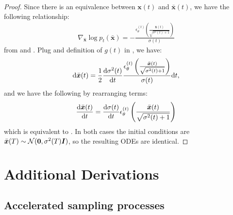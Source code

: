 \begin{proof}
Since there is an equivalence between $\bm{x}(t)$ and $\bar{\bm{x}}(t)$, we have the following relationship:
\begin{gather}
    \nabla_{\bar{\bm{x}}} \log p_t(\bar{\bm{x}}) = - \frac{\epsilon_\theta^{(t)}\left(\frac{\bar{\bm{x}}(t)}{\sqrt{\sigma^2(t) + 1}}\right)}{\sigma(t)} \label{eq:score-equivalence}
\end{gather}
from  and . Plug  and definition of $g(t)$ in , we have:
\begin{align}
    \mathrm{d} \bar{\bm{x}}(t) = \frac{1}{2} \frac{\mathrm{d} \sigma^2(t)}{\mathrm{d} t} \frac{\epsilon_\theta^{(t)}\left(\frac{\bar{\bm{x}}(t)}{\sqrt{\sigma^2(t) + 1}}\right)}{\sigma(t)} \mathrm{d} t,
\end{align}
and we have the following by rearranging terms:
\begin{align}
    \frac{\mathrm{d} \bar{\bm{x}}(t)}{\mathrm{d} t} = \frac{\mathrm{d} \sigma(t)}{\mathrm{d} t} \epsilon_\theta^{(t)}\left(\frac{\bar{\bm{x}}(t)}{\sqrt{\sigma^2(t) + 1}}\right)
\end{align}
which is equivalent to . In both cases the initial conditions are $\bar{\bm{x}}(T) \sim \mathcal{N}({\bm{0}}, \sigma^2(T) \bm{I})$, so the resulting ODEs are identical.
\end{proof}
\section{Additional Derivations}
\subsection{Accelerated sampling processes}
\label{app:acceleration}

